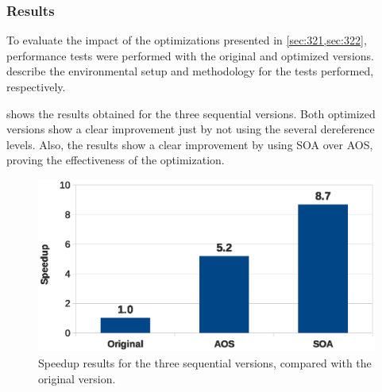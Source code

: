 \subsubsection{Results}


To evaluate the impact of the optimizations presented in \cref{sec:321,sec:322}, performance tests were performed with the original and optimized versions.
 describe the environmental setup and methodology for the tests performed, respectively.

 shows the results obtained for the three sequential versions.
Both optimized versions show a clear improvement just by not using the several dereference levels. Also, the results show a clear improvement by using SOA over AOS, proving the effectiveness of the optimization.

\begin{figure}[!htp]
	\centering
	\includegraphics[width=\columnwidth]{images/graph_comparison_seq.eps}
	\caption{Speedup results for the three sequential versions, compared with the original version.}
	\label{fig:seq:results}
\end{figure}